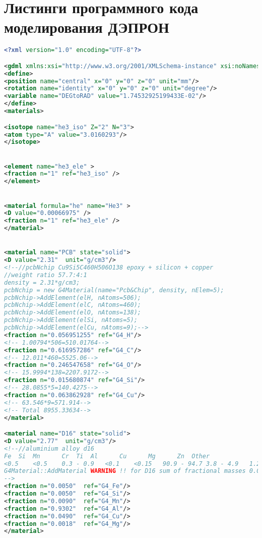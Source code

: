 \chapter{Листинги программного кода моделирования ДЭПРОН} \label{AppendixС}
\begin{lstlisting}[language=XML, firstline=1, lastline=89]
<?xml version="1.0" encoding="UTF-8"?>

<gdml xmlns:xsi="http://www.w3.org/2001/XMLSchema-instance" xsi:noNamespaceSchemaLocation="http://service-spi.web.cern.ch/service-spi/app/releases/GDML/schema/gdml.xsd">
<define>
<position name="central" x="0" y="0" z="0" unit="mm"/>
<rotation name="identity" x="0" y="0" z="0" unit="degree"/>
<variable name="DEGtoRAD" value="1.74532925199433E-02"/>
</define>
<materials>

<isotope name="he3_iso" Z="2" N="3">
<atom type="A" value="3.0160293"/>
</isotope> 


<element name="he3_ele" >
<fraction n="1" ref="he3_iso" />
</element>


<material formula="he" name="He3" >
<D value="0.00066975" />
<fraction n="1" ref="he3_ele" />
</material>


<material name="PCB" state="solid">
<D value="2.31"  unit="g/cm3"/>
<!--//pcbNchip Cu9Si5C460H506O138 epoxy + silicon + copper
//weight ratio 57.7:4:1
density = 2.31*g/cm3;
pcbNchip = new G4Material(name="Pcb&Chip", density, nElem=5);
pcbNchip->AddElement(elH, nAtoms=506);
pcbNchip->AddElement(elC, nAtoms=460);
pcbNchip->AddElement(elO, nAtoms=138);
pcbNchip->AddElement(elSi, nAtoms=5);
pcbNchip->AddElement(elCu, nAtoms=9);-->
<fraction n="0.056951255" ref="G4_H"/>
<!-- 1.00794*506=510.01764-->
<fraction n="0.616957286" ref="G4_C"/>
<!-- 12.011*460=5525.06-->
<fraction n="0.246547658" ref="G4_O"/>
<!-- 15.9994*138=2207.9172-->
<fraction n="0.015680874" ref="G4_Si"/>
<!-- 28.0855*5=140.4275-->
<fraction n="0.063862928" ref="G4_Cu"/>
<!-- 63.546*9=571.914-->
<!-- Total 8955.33634-->
</material>

<material name="D16" state="solid">
<D value="2.77"  unit="g/cm3"/>
<!--//aluminium alloy d16
Fe	Si	Mn		Cr	Ti	Al		Cu		Mg		Zn	Other				-
<0.5	<0.5	0.3 - 0.9	<0.1	<0.15	90.9 - 94.7	3.8 - 4.9	1.2 - 1.8	<0.25	all other 0.05; total 0.15	Ti+Zr < 0.2
G4Material::AddMaterial WARNING !! for D16 sum of fractional masses 0.0874738 is not 1 - results may be wrong
-->
<fraction n="0.0050"  ref="G4_Fe"/>
<fraction n="0.0050"  ref="G4_Si"/>
<fraction n="0.0090"  ref="G4_Mn"/>
<fraction n="0.9302"  ref="G4_Al"/>
<fraction n="0.0490"  ref="G4_Cu"/>
<fraction n="0.0018"  ref="G4_Mg"/>
</material>


\end{lstlisting}
